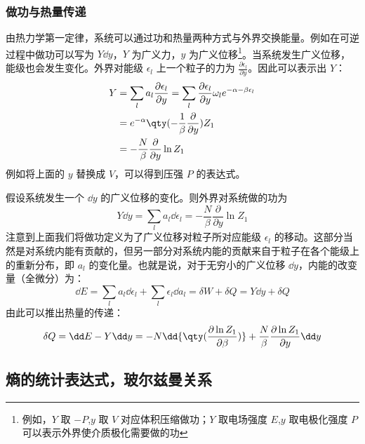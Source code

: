 \subsubsection{做功与热量传递}
由热力学第一定律，系统可以通过功和热量两种方式与外界交换能量。例如在可逆过程中做功可以写为 $Y\dd y$，$Y$ 为广义力，$y$ 为广义位移\footnote{例如，$Y$ 取 $-P$,$y$ 取 $V$ 对应体积压缩做功；$Y$ 取电场强度 $E$,$y$ 取电极化强度 $P$ 可以表示外界使介质极化需要做的功}。当系统发生广义位移，能级也会发生变化。外界对能级 $\epsilon_l$ 上一个粒子的力为 $\frac{\partial \epsilon_l}{\partial y}$。因此可以表示出 $Y$：
\begin{equation}
\begin{aligned}
Y&=\sum_l a_l\frac{\partial \epsilon_l}{\partial y}=\sum_l \frac{\partial \epsilon_l}{\partial y}\omega_le^{-\alpha-\beta\epsilon_l}\\
&=e^{-\alpha}\qty(-\frac{1}{\beta}\frac{\partial }{\partial y})Z_1\\
&=-\frac{N}{\beta}\frac{\partial }{\partial y}\ln Z_1
\end{aligned}
\end{equation}
例如将上面的 $y$ 替换成 $V$，可以得到压强 $P$ 的表达式。

假设系统发生一个 $\dd y$ 的广义位移的变化。则外界对系统做的功为
\begin{equation}
Y\dd y=\sum_l a_l\dd \epsilon_l=-\frac{N}{\beta}\frac{\partial }{\partial y}\ln Z_1
\end{equation}
注意到上面我们将做功定义为了广义位移对粒子所对应能级 $\epsilon_l$ 的移动。这部分当然是对系统内能有贡献的，但另一部分对系统内能的贡献来自于粒子在各个能级上的重新分布，即 $a_l$ 的变化量。也就是说，对于无穷小的广义位移 $\dd y$，内能的改变量（全微分）为：
\begin{equation}
\dd E=\sum_l a_l\dd \epsilon_l+\sum_l\epsilon_l\dd a_l=\delta W+\delta Q=Y\dd y+\delta Q
\end{equation}
由此可以推出热量的传递：
\begin{equation}\label{TheSta_eq2}
\delta Q=\dd E-Y\dd y=
-N\dd{\qty(\frac{\partial \ln Z_1}{\partial \beta})}+\frac{N}{\beta}\frac{\partial \ln Z_1}{\partial y}\dd y
\end{equation}
\subsection{熵的统计表达式，玻尔兹曼关系}
